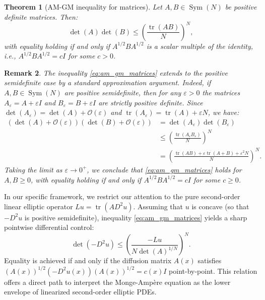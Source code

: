 \documentclass{article}
\newtheorem{theorem}{Theorem}[section]
\newtheorem{remark}[theorem]{Remark}
\numberwithin{equation}{section}
\begin{document}
\begin{theorem}[AM-GM inequality for matrices]
Let $A, B \in \operatorname{Sym}(N)$ be positive definite matrices. Then:
\begin{equation}\label{eq:am_gm_matrices}
\det(A)\det(B) \le \left(\frac{\operatorname{tr}(AB)}{N}\right)^N,
\end{equation}
with equality holding if and only if $A^{1/2}BA^{1/2}$ is a scalar multiple of the identity, i.e., $A^{1/2}BA^{1/2}=cI$ for some $c > 0$.
\end{theorem}

\begin{remark}
The inequality \eqref{eq:am_gm_matrices} extends to the positive semidefinite case by a standard approximation argument.
Indeed, if $A, B \in \operatorname{Sym}(N)$ are positive semidefinite, then for any $\varepsilon > 0$ the matrices $A_\varepsilon = A + \varepsilon I$ and $B_\varepsilon = B + \varepsilon I$ are strictly positive definite. Since $\det(A_\varepsilon) = \det(A) + \mathcal{O}(\varepsilon)$ and $\operatorname{tr}(A_\varepsilon) = \operatorname{tr}(A) + \varepsilon N$, we have:
\[
\begin{aligned}
\left( \det(A) + \mathcal{O}(\varepsilon) \right) \left( \det(B) + \mathcal{O}(\varepsilon) \right) &= \det(A_\varepsilon)\det(B_\varepsilon) \\
&\le \left(\frac{\operatorname{tr}(A_\varepsilon B_\varepsilon)}{N}\right)^N \\
&= \left(\frac{\operatorname{tr}(AB)+\varepsilon\operatorname{tr}(A+B)+\varepsilon^2 N}{N}\right)^N.
\end{aligned}
\]
Taking the limit as $\varepsilon \to 0^+$, we conclude that \eqref{eq:am_gm_matrices} holds for $A, B \ge 0$, with equality holding if and only if $A^{1/2}BA^{1/2} = cI$ for some $c \ge 0$.
\end{remark}

\noindent In our specific framework, we restrict our attention to the pure second-order linear elliptic operator $Lu = \operatorname{tr}(AD^2u)$. Assuming that $u$ is concave (so that $-D^2u$ is positive semidefinite), inequality \eqref{eq:am_gm_matrices} yields a sharp pointwise differential control:
\begin{equation}\label{eq:pointwise_ma_linear}
\det(-D^2u) \le \left(\frac{-Lu}{N\det(A)^{1/N}}\right)^N.
\end{equation}
Equality is achieved if and only if the diffusion matrix $A(x)$ satisfies $(A(x))^{1/2}(-D^2u(x))(A(x))^{1/2} = c(x)I$ point-by-point. This relation offers a direct path to interpret the Monge-Ampère equation as the lower envelope of linearized second-order elliptic PDEs.
\end{document}
